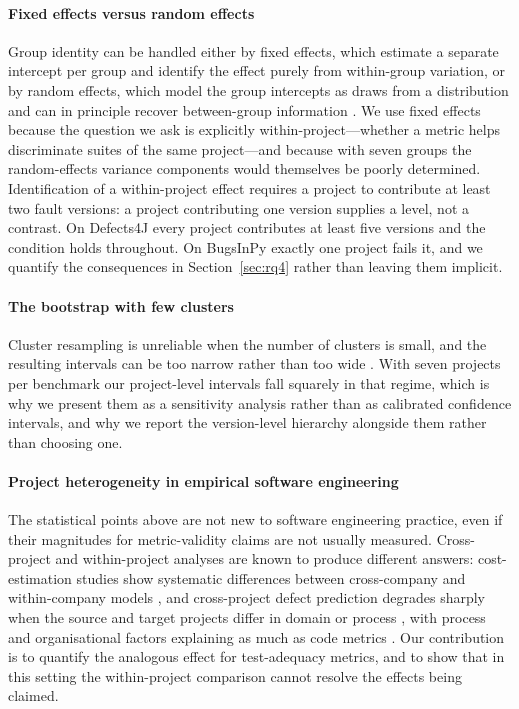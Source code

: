 \documentclass[preprint,12pt]{elsarticle}
\begin{document}
\paragraph{Fixed effects versus random effects} Group identity can be
handled either by fixed effects, which estimate a separate intercept per
group and identify the effect purely from within-group variation, or by
random effects, which model the group intercepts as draws from a
distribution and can in principle recover between-group information
\cite{wooldridge2010econometric}. We use fixed effects because the
question we ask is explicitly within-project---whether a metric helps
discriminate suites of the same project---and because with seven groups
the random-effects variance components would themselves be poorly
determined. Identification of a within-project effect requires a project to
contribute at least two fault versions: a project contributing one version
supplies a level, not a contrast. On Defects4J every project contributes at
least five versions and the condition holds throughout. On BugsInPy exactly
one project fails it, and we quantify the consequences in
Section~\ref{sec:rq4} rather than leaving them implicit.

\paragraph{The bootstrap with few clusters} Cluster resampling is
unreliable when the number of clusters is small, and the resulting
intervals can be too narrow rather than too wide
\cite{cameron2008bootstrap}. With seven projects per benchmark our
project-level intervals fall squarely in that regime, which is why we
present them as a sensitivity analysis rather than as calibrated
confidence intervals, and why we report the version-level hierarchy
alongside them rather than choosing one.

\paragraph{Project heterogeneity in empirical software engineering} The
statistical points above are not new to software engineering practice, even
if their magnitudes for metric-validity claims are not usually measured.
Cross-project and within-project analyses are known to produce different
answers: cost-estimation studies show systematic differences between
cross-company and within-company models \cite{kitchenham2007cross}, and
cross-project defect prediction degrades sharply when the source and target
projects differ in domain or process \cite{zimmermann2009cross}, with
process and organisational factors explaining as much as code metrics
\cite{nagappan2006mining}. Our contribution is to quantify the analogous
effect for test-adequacy metrics, and to show that in this setting the
within-project comparison cannot resolve the effects being claimed.
\end{document}

